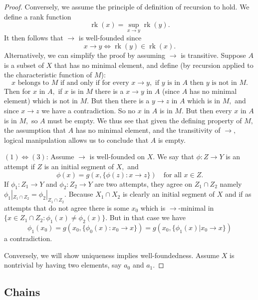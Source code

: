 \documentclass[
  letterpaper,
  10pt,
  reqno,
  twopage,
  openany]{book}
\theoremstyle{plain}
\theoremstyle{definition}
\theoremstyle{definition}
\theoremstyle{definition}
\theoremstyle{plain}
\theoremstyle{plain}
\theoremstyle{remark}
\begin{document}
\begin{proof}
Conversely, we assume the principle of definition of recursion to hold.
We define a rank function \[
\mathop{rk}(x)=\mathop{sup}_{x\longrightarrow y} \mathop{rk}(y).
\] It then follows that \(\longrightarrow\) is well-founded since \[
x\longrightarrow y \Leftrightarrow \mathop{rk} (y)\in \mathop{rk}(x).
\] Alternatively, we can simplify the proof by assuming
\(\longrightarrow\) is transitive. Suppose \(A\) is a subset of \(X\)
that has no minimal element, and define (by recursion applied to the
characteristic function of \(M\)): \[
\textrm{
$x$ belongs to $M$ if and only if for every $x\longrightarrow y,$ if $y$ is in $A$ then $y$ is not in $M.$
}
\] Then for \(x\) in \(A,\) if \(x\) is in \(M\) there is a
\(x\longrightarrow y\) in \(A\) (since \(A\) has no minimal element)
which is not in \(M.\) But then there is a \(y\longrightarrow z\) in
\(A\) which is in \(M,\) and since \(x\longrightarrow z\) we have a
contradiction. So no \(x\) in \(A\) is in \(M.\) But then every \(x\) in
\(A\) is in \(M,\) so \(A\) must be empty. We thus see that given the
defining property of \(M,\) the assumption that \(A\) has no minimal
element, and the transitivity of \(\longrightarrow,\) logical
manipulation allows us to conclude that \(A\) is empty.

\par

\((1)\Leftrightarrow(3)\): Assume \(\longrightarrow\) is well-founded on
\(X.\) We say that \(\phi:Z\to Y\) is an attempt if \(Z\) is an initial
segment of \(X,\) and \[
\phi(x)=g(x,\{\phi(z):x \longrightarrow z\}) \quad \text{for all $x\in Z.$}
\] If \(\phi_1:Z_1\to Y\) and \(\phi_2: Z_2\to Y\) are two attempts,
they agree on \(Z_1\cap Z_2\) namely
\(\phi_1|_{Z_1 \cap Z_2}=\phi_2|_{Z_1 \cap Z_2}.\) Because
\(X_1\cap X_2\) is clearly an initial segment of \(X\) and if as
attempts that do not agree there is some \(x_0\) which is
\(\longrightarrow\)-minimal in
\(\{x\in Z_1 \cap Z_2 : \phi_1(x)\neq \phi_2(x)\}.\) But in that case we
have \[
\phi_1(x_0)
=g(x_0,\{\phi_0(x) : x_0\longrightarrow x\})
=g(x_0, \{\phi_1(x) | x_0\longrightarrow x\})
\] a contradiction.

Conversely, we will show uniqueness implies well-foundedness. Assume
\(X\) is nontrivial by having two elements, say \(a_0\) and \(a_1.\)

\end{proof}

\hypertarget{chains}{%
\subsection{Chains}\label{chains}}
\end{document}
